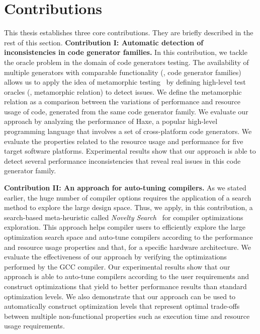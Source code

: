 \section{Contributions}
This thesis establishes three core contributions. They are briefly described in the rest of this section.
\newpage
\textbf{Contribution I: Automatic detection of inconsistencies in code generator families.}
In this contribution, we tackle the oracle problem in the domain of code generators testing.
The availability of multiple generators with comparable functionality (\ie, code generator families) allows us to apply the idea of metamorphic testing~\cite{zhou2004metamorphic} by defining high-level test oracles (\ie, metamorphic relation) to detect issues. We define the metamorphic relation as a comparison between the variations of performance and resource usage of code, generated from the same code generator family.
We evaluate our approach by analyzing the performance of Haxe, a popular high-level programming language that involves a set of cross-platform code generators. We evaluate the properties related to the resource usage and performance for five target software platforms. Experimental results show that our approach is able to detect several performance inconsistencies that reveal real issues in this code generator family. 

\textbf{Contribution II: An approach for auto-tuning compilers.}
As we stated earlier, the huge number of compiler options requires the application of a search method to explore the large design space. Thus, we apply, in this contribution, a search-based meta-heuristic called \textit{Novelty Search}~\cite{lehman2008exploiting} for compiler optimizations exploration. This approach helps compiler users to efficiently explore the large optimization search space and auto-tune compilers according to the performance and resource usage properties and that, for a specific hardware architecture. 
We evaluate the effectiveness of our approach by verifying the optimizations performed by the GCC compiler.
Our experimental results show that our approach is able to auto-tune compilers according to the user requirements and construct optimizations that yield to better performance results than standard optimization levels. We also demonstrate that our approach can be used to automatically construct optimization levels that represent optimal trade-offs between multiple non-functional properties such as execution time and resource usage requirements.

